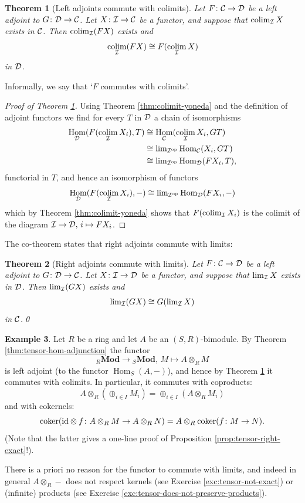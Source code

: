 \documentclass[11pt]{amsbook}
\DeclareMathOperator\Hom{Hom}
\DeclareMathOperator\Mod{{\bf{Mod}}}
\DeclareMathOperator\coker{coker}
\DeclareMathOperator\colim{colim}
\def\id{{\rm id}}
\def\opp{\mathrm{op}}
\def\Mod{\mathbf{Mod}}
\theoremstyle{plain}
\newtheorem{theorem}{Theorem}
\theoremstyle{definition}
\newtheorem{example}[theorem]{Example}
\begin{document}
\begin{theorem}[Left adjoints commute with colimits]\label{thm:left-adjoints-commute-with-colimits}
Let $F\colon {\mathcal{C}}\to {\mathcal{D}}$ be a left adjoint to $G\colon {\mathcal{D}}\to {\mathcal{C}}$. Let $X\colon {\mathcal{I}} \to {\mathcal{C}}$ be a functor, and suppose that $\colim_\cI X$ exists in ${\mathcal{C}}$. Then $\colim_\cI (FX)$ exists and
\[
	\colim_\cI (FX) \cong F(\colim_\cI X)
\]
in ${\mathcal{D}}$.
\end{theorem}

Informally, we say that `$F$ commutes with colimits'.

\begin{proof}[Proof of Theorem \ref{thm:left-adjoints-commute-with-colimits}]
Using Theorem \ref{thm:colimit-yoneda} and the definition of adjoint functors we find for every $T$ in ${\mathcal{D}}$ a chain of isomorphisms
\begin{align*}
	\Hom_\cD(F(\colim_\cI X_i), T)
		&\cong \Hom_\cC( \colim_\cI X_i , GT ) \\
		&\cong \textstyle\lim_{\cI^\opp} \Hom_\cC( X_i, GT) \\
		&\cong \textstyle\lim_{\cI^\opp} \Hom_\cD( FX_i, T),
\end{align*}
functorial in $T$,  and hence an isomorphism of functors
\[
	\Hom_\cD(F(\colim_\cI X_i), - ) \cong 
	 \textstyle\lim_{\cI^\opp} \Hom_\cD( FX_i, -)
\]
which by Theorem \ref{thm:colimit-yoneda} shows that $F(\colim_\cI X_i)$ is the colimit of the
diagram ${\mathcal{I}} \to {\mathcal{D}},\, i \mapsto FX_i$.
\end{proof}

The co-theorem states that right adjoints commute with limits:

\begin{theorem}[Right adjoints commute with limits]\label{thm:right-adjoints-commute-with-limits}
Let $F\colon {\mathcal{C}}\to {\mathcal{D}}$ be a left adjoint to $G\colon {\mathcal{D}}\to {\mathcal{C}}$. Let $X\colon {\mathcal{I}} \to {\mathcal{D}}$ be a functor, and suppose that $\lim_{\mathcal{I}} X$ exists in ${\mathcal{D}}$. Then $\lim_{\mathcal{I}} (GX)$ exists and
\[
	\textstyle\lim_{\mathcal{I}} (GX) \cong G(\textstyle\lim_{\mathcal{I}} X)
\]
in ${\mathcal{C}}$.\qed
\end{theorem}




\begin{example}
Let $R$ be a ring and let $A$ be an $(S,R)$-bimodule.
By Theorem \ref{thm:tensor-hom-adjunction} the functor
\[
	{}_R\Mod \to {}_S\Mod,\, M \mapsto A \otimes_R M
\]
is left adjoint (to the functor $\Hom_S(A,-)$), and hence by Theorem \ref{thm:left-adjoints-commute-with-colimits} it commutes with 
colimits. In particular, it commutes with coproducts:
\[
	A\otimes_R (\oplus_{i\in I} M_i) = \oplus_{i\in I} ( A\otimes_R M_i )
\]
and with cokernels:
\[
	\coker( \id\otimes f\colon A\otimes_R M \to A\otimes_R N ) =
	A\otimes_R \coker(f\colon M \to N).
\]
(Note that the latter gives a one-line proof of Proposition \ref{prop:tensor-right-exact}!). 

There is a priori no reason for the functor to commute with limits, and indeed in general $A\otimes_R -$ does not respect kernels (see Exercise \ref{exc:tensor-not-exact}) or (infinite) products (see Exercise \ref{exc:tensor-does-not-preserve-products}).
\end{example}
\end{document}
